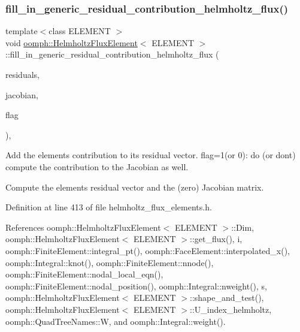 \mbox{\label{classoomph_1_1HelmholtzFluxElement_a4f6caf80f078c526144990ee77bfaf92}} 
\subsubsection{\texorpdfstring{fill\+\_\+in\+\_\+generic\+\_\+residual\+\_\+contribution\+\_\+helmholtz\+\_\+flux()}{fill\_in\_generic\_residual\_contribution\_helmholtz\_flux()}}
{\footnotesize\ttfamily template$<$class E\+L\+E\+M\+E\+NT $>$ \\
void \hyperlink{classoomph_1_1HelmholtzFluxElement}{oomph\+::\+Helmholtz\+Flux\+Element}$<$ E\+L\+E\+M\+E\+NT $>$\+::fill\+\_\+in\+\_\+generic\+\_\+residual\+\_\+contribution\+\_\+helmholtz\+\_\+flux (\begin{DoxyParamCaption}\item[{\hyperlink{classoomph_1_1Vector}{Vector}$<$ double $>$ \&}]{residuals,  }\item[{\hyperlink{classoomph_1_1DenseMatrix}{Dense\+Matrix}$<$ double $>$ \&}]{jacobian,  }\item[{const unsigned \&}]{flag }\end{DoxyParamCaption})\hspace{0.3cm}{\ttfamily [protected]}, {\ttfamily [virtual]}}



Add the element\textquotesingle{}s contribution to its residual vector. flag=1(or 0)\+: do (or don\textquotesingle{}t) compute the contribution to the Jacobian as well. 

Compute the element\textquotesingle{}s residual vector and the (zero) Jacobian matrix. 

Definition at line 413 of file helmholtz\+\_\+flux\+\_\+elements.\+h.



References oomph\+::\+Helmholtz\+Flux\+Element$<$ E\+L\+E\+M\+E\+N\+T $>$\+::\+Dim, oomph\+::\+Helmholtz\+Flux\+Element$<$ E\+L\+E\+M\+E\+N\+T $>$\+::get\+\_\+flux(), i, oomph\+::\+Finite\+Element\+::integral\+\_\+pt(), oomph\+::\+Face\+Element\+::interpolated\+\_\+x(), oomph\+::\+Integral\+::knot(), oomph\+::\+Finite\+Element\+::nnode(), oomph\+::\+Finite\+Element\+::nodal\+\_\+local\+\_\+eqn(), oomph\+::\+Finite\+Element\+::nodal\+\_\+position(), oomph\+::\+Integral\+::nweight(), s, oomph\+::\+Helmholtz\+Flux\+Element$<$ E\+L\+E\+M\+E\+N\+T $>$\+::shape\+\_\+and\+\_\+test(), oomph\+::\+Helmholtz\+Flux\+Element$<$ E\+L\+E\+M\+E\+N\+T $>$\+::\+U\+\_\+index\+\_\+helmholtz, oomph\+::\+Quad\+Tree\+Names\+::W, and oomph\+::\+Integral\+::weight().




